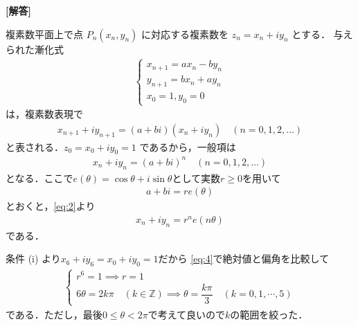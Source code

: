 \documentclass[../../main.tex]{subfiles}
\begin{document}
\begin{oframed}
  
\end{oframed}

{\bf [解答]}

複素数平面上で点 $P_n(x_n, y_n)$ に対応する複素数を $z_n = x_n + i y_n$ とする．
与えられた漸化式
\begin{align}
  \begin{cases}
    x_{n+1} = ax_n - by_n \\
    y_{n+1} = bx_n + ay_n \\
    x_0=1, y_0=0
  \end{cases} \label{eq:1}
\end{align}
は，複素数表現で
\begin{align}
  x_{n+1}+iy_{n+1} = (a+bi)(x_n+iy_n) \quad (n = 0, 1, 2, \dots)
\end{align}
と表される．$z_0 = x_0 + i y_0 = 1$ であるから，一般項は
\begin{align}
  x_{n}+iy_{n} = (a+bi)^n \quad (n = 0, 1, 2, \dots) \label{eq:2}
\end{align}
となる．ここで$e(\theta)=\cos\theta+i\sin\theta$として実数$r\ge 0$を用いて
\begin{align}
  a+bi = re(\theta) \label{eq:3}
\end{align}
とおくと，\cref{eq:2}より
\begin{align}
  x_{n}+iy_{n} = r^ne(n\theta) \label{eq:4}
\end{align}
である．

条件 (i) より$x_6+iy_6=x_0+iy_0=1$だから \cref{eq:4}で絶対値と偏角を比較して
\begin{align}
  \begin{cases}
    r^6 = 1 \implies r = 1 \\
    6\theta = 2k\pi \quad (k \in \mathbb{Z}) \implies \theta = \dfrac{k\pi}{3} \quad (k=0,1,\cdots,5)
  \end{cases} \label{eq:5}
\end{align}
である．ただし，最後$0 \le \theta < 2\pi$で考えて良いので$k$の範囲を絞った．
\end{document}
